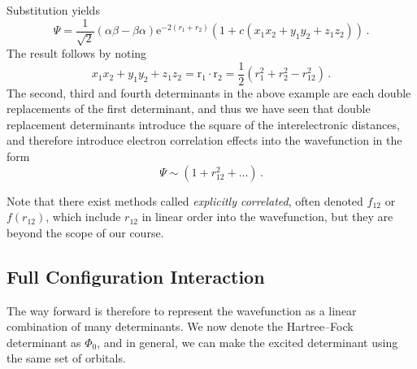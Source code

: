 \documentclass{article}
\theoremstyle{plain}\theoremheaderfont{\normalfont\itshape}\theorembodyfont{\rmfamily}\theoremseparator{.}\newtheorem*{rem}{Remark}\newtheorem*{ex}{Example}\newtheorem*{proof}{Proof}\newtheorem*{altp}{Alternative proof}
\theoremstyle{plain}\theoremheaderfont{\normalfont\bfseries}\theorembodyfont{\rmfamily}\theoremseparator{.}\newtheorem{thm}{Theorem}[section]\newtheorem{lem}[thm]{Lemma}\newtheorem{prop}[thm]{Proposition}\newtheorem*{cor}{Corollary}\newtheorem{defn}[thm]{Definition}\newtheorem{clm}[thm]{Claim}\newtheorem{clminproof}{Claim}
\theoremstyle{break}\theoremheaderfont{\normalfont\itshape}\theorembodyfont{\rmfamily}\theoremseparator{.\medskip}\newtheorem*{proofskip}{Proof}\newtheorem*{exs}{Examples}\newtheorem*{rems}{Remarks}
\theoremstyle{break}\theoremheaderfont{\normalfont\bfseries}\theorembodyfont{\rmfamily}\theoremseparator{.\medskip}\newtheorem{lemskip}[thm]{Lemma}\newtheorem{defnskip}[thm]{Definition}\newtheorem{propskip}[thm]{Proposition}\newtheorem{thmskip}[thm]{Theorem}
\numberwithin{equation}{section}
\newcommand{\e}{\mathrm{e}}
\newcommand{\vb}[1]{\bm{\mathrm{#1}}}
\begin{document}
    Substitution yields
    \begin{equation}
        \Psi=\frac{1}{\sqrt{2}}(\alpha\beta-\beta\alpha)\e^{-2(r_1+r_2)}(1+c(x_1x_2+y_1y_2+z_1z_2))\,.
    \end{equation}
    The result follows by noting
    \begin{equation}
        x_1x_2+y_1y_2+z_1z_2=\vb{r}_1\cdot\vb{r}_2=\frac{1}{2}(r_1^2+r_2^2-r_{12}^2)\,.
    \end{equation}
    The second, third and fourth determinants in the above example are each double replacements of the first determinant, and thus we have seen that double replacement determinants introduce the square of the interelectronic distances, and therefore introduce electron correlation effects into the wavefunction in the form
    \begin{equation}
        \Psi\sim(1+r_{12}^2+\dots)\,.
    \end{equation}

    Note that there exist methods called \textit{explicitly correlated}, often denoted \(f_{12}\) or \(f(r_{12})\), which include \(r_{12}\) in linear order into the wavefunction, but they are beyond the scope of our course.
    \subsection{Full Configuration Interaction}
    The way forward is therefore to represent the wavefunction as a linear combination of many determinants. We now denote the Hartree--Fock determinant as \(\Phi_0\), and in general, we can make the excited determinant using the same set of orbitals.
    \begin{figure}[ht!]
        \centering
    \end{figure}
\end{document}
